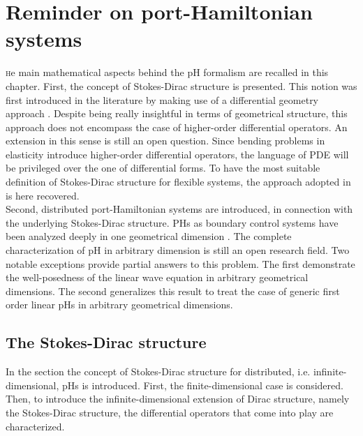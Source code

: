 \chapter{Reminder on port-Hamiltonian systems}

\minitoc

\lettrine{\color{theme}{T}}he main mathematical aspects behind the pH formalism are recalled in this chapter. First, the concept of Stokes-Dirac structure is presented. This notion was first introduced in the literature by making use of a differential geometry approach \cite{vanderschaft2002}. Despite being really insightful in terms of geometrical structure, this approach does not encompass the case of higher-order differential operators. An extension in this sense is still an open question. Since bending problems in elasticity introduce higher-order differential operators, the language of PDE will be privileged over the one of differential forms. To have the most suitable definition of Stokes-Dirac structure for flexible systems, the approach adopted in \cite{macchelli2004modelling} is here recovered. \\

Second, distributed port-Hamiltonian systems are introduced, in connection with the underlying Stokes-Dirac structure. PHs as boundary control systems have been analyzed deeply in one geometrical dimension \cite{zwart2012,legorrec2005}. The complete characterization of pH in arbitrary dimension is still an open research field. Two notable exceptions \cite{zwart2015wave,skrepek2019wellposedness} provide partial answers to this problem. The first demonstrate the well-posedness of the linear wave equation in arbitrary geometrical dimensions. The second generalizes this result to treat the case of generic first order linear pHs in arbitrary geometrical dimensions.

 
\section{The Stokes-Dirac structure}

In the section the concept of Stokes-Dirac structure for distributed, i.e. infinite-dimensional, pHs is introduced. First, the finite-dimensional case is considered. Then, to introduce the infinite-dimensional extension of Dirac structure, namely the Stokes-Dirac structure, the differential operators that come into play are characterized. 

